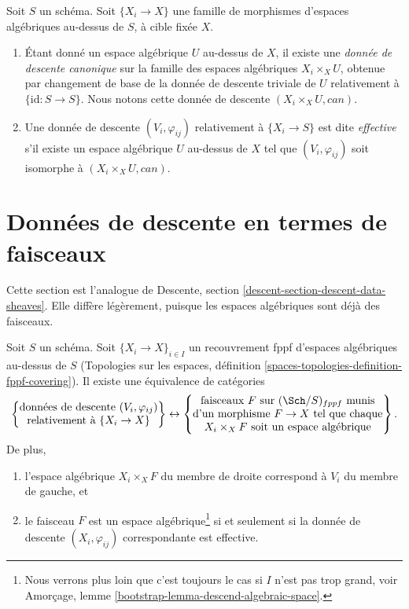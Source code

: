 \begin{definition}
\label{definition-effective-family}
Soit $S$ un schéma.
Soit $\{X_i \to X\}$ une famille de morphismes d'espaces algébriques au-dessus de $S$,
à cible fixée $X$.
\begin{enumerate}
\item Étant donné un espace algébrique $U$ au-dessus de $X$,
il existe une {\it donnée de descente canonique} sur la famille des
espaces algébriques $X_i \times_X U$, obtenue par changement de base de la donnée de descente
triviale de $U$ relativement à $\{\text{id} : S \to S\}$.
Nous notons cette donnée de descente $(X_i \times_X U, can)$.
\item Une donnée de descente $(V_i, \varphi_{ij})$
relativement à $\{X_i \to S\}$ est dite {\it effective}
s'il existe un espace algébrique $U$ au-dessus de $X$ tel que
$(V_i, \varphi_{ij})$ soit isomorphe à $(X_i \times_X U, can)$.
\end{enumerate}
\end{definition}






\section{Données de descente en termes de faisceaux}
\label{section-descent-data-sheaves}

\noindent
Cette section est l'analogue de Descente, section
\ref{descent-section-descent-data-sheaves}.
Elle diffère légèrement, puisque les espaces algébriques sont déjà des faisceaux.

\begin{lemma}
\label{lemma-descent-data-sheaves}
Soit $S$ un schéma. Soit $\{X_i \to X\}_{i \in I}$ un recouvrement fppf
d'espaces algébriques au-dessus de $S$ (Topologies sur les espaces,
définition \ref{spaces-topologies-definition-fppf-covering}).
Il existe une équivalence de catégories
$$
\left\{
\begin{matrix}
\text{données de descente }(V_i, \varphi_{ij})\\
\text{relativement à }\{X_i \to X\}
\end{matrix}
\right\}
\leftrightarrow
\left\{
\begin{matrix}
\text{faisceaux }F\text{ sur }(\Sch/S)_{fppf}\text{ munis}\\
\text{d'un morphisme }F \to X\text{ tel que chaque}\\
X_i \times_X F\text{ soit un espace algébrique}
\end{matrix}
\right\}.
$$
De plus,
\begin{enumerate}
\item l'espace algébrique $X_i \times_X F$ du membre de droite
correspond à $V_i$ du membre de gauche, et
\item le faisceau $F$ est un espace algébrique\footnote{Nous verrons
plus loin que c'est toujours le cas si $I$ n'est pas trop grand, voir
Amorçage, lemme \ref{bootstrap-lemma-descend-algebraic-space}.}
si et seulement si la
donnée de descente $(X_i, \varphi_{ij})$ correspondante est effective.
\end{enumerate}
\end{lemma}

